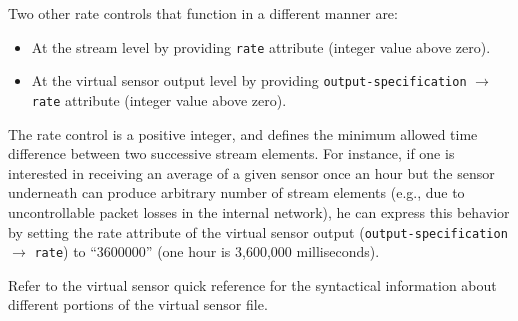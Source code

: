 Two other rate controls that function in a different manner are:
\begin{itemize}
\item At the stream level by providing \texttt{rate} attribute (integer value above zero).
\item At the virtual sensor output level by providing \texttt{output-specification} $\rightarrow$ \texttt{rate} attribute (integer value above zero).
\end{itemize}

The rate control is a positive integer, and defines the minimum allowed time difference between two successive stream elements.
For instance, if one is interested in receiving an average of a given sensor once an hour but the sensor underneath can produce arbitrary number of stream elements 
(e.g., due to uncontrollable packet losses in the internal network), he can express this behavior by setting the rate attribute of the virtual sensor output 
(\texttt{output-specification} $\rightarrow$ \texttt{rate}) to ``3600000'' (one hour is 3,600,000 milliseconds).


Refer to the virtual sensor quick reference for the syntactical
information about different portions of the virtual sensor file.

